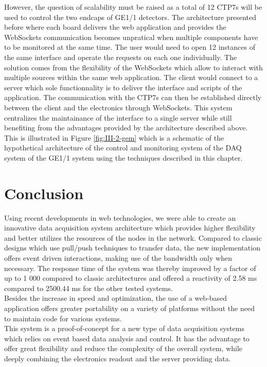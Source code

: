    However, the question of scalability must be raised as a total of 12 CTP7s will be used to control the two endcaps of GE1/1 detectors. The architecture presented before where each board delivers the web application and provides the WebSockets communication becomes unpratical when multiple components have to be monitored at the same time. The user would need to open 12 instances of the same interface and operate the requests on each one individually. The solution comes from the flexibility of the WebSockets which allow to interact with multiple sources within the same web application. The client would connect to a server which sole functionnality is to deliver the interface and scripts of the application. The communication with the CTP7s can then be established directly between the client and the electronics through WebSockets. This system centralizes the maintainance of the interface to a single server while still benefiting from the advantages provided by the architecture described above. This is illustrated in Figure \ref{fig:III-2-gem} which is a schematic of the hypothetical architecture of the control and monitoring system of the DAQ system of the GE1/1 system using the techniques described in this chapter.

  \section{Conclusion}

    Using recent developments in web technologies, we were able to create an innovative data acquisition system architecture which provides higher flexibility and better utilizes the resources of the nodes in the network. Compared to classic designs which use pull/push techniques to transfer data, the new implementation offers event driven interactions, making use of the bandwidth only when necessary. The response time of the system was thereby improved by a factor of up to 1 000 compared to classic architectures and offered a reactivity of 2.58 ms compared to 2500.44 ms for the other tested systems. \\

    Besides the increase in speed and optimization, the use of a web-based application offers greater portability on a variety of platforms without the need to maintain code for various systems. \\

    This system is a proof-of-concept for a new type of data acquisition systems which relies on event based data analysis and control. It has the advantage to offer great flexibility and reduce the complexity of the overall system, while deeply combining the electronics readout and the server providing data.
